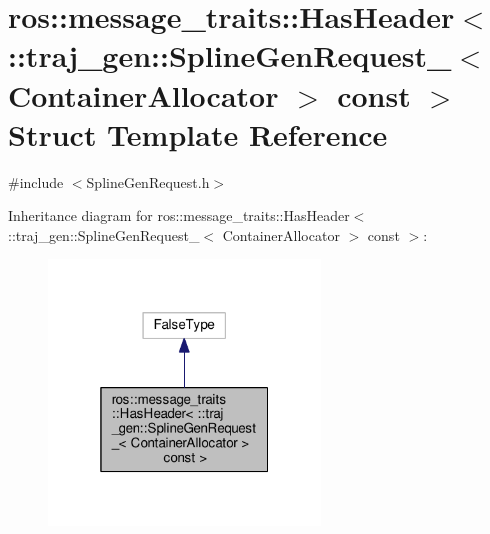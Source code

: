 \hypertarget{structros_1_1message__traits_1_1_has_header_3_01_1_1traj__gen_1_1_spline_gen_request___3_01_cont2d272e5e4f2aba4d565aef3b6188f511}{}\section{ros\+:\+:message\+\_\+traits\+:\+:Has\+Header$<$ \+:\+:traj\+\_\+gen\+:\+:Spline\+Gen\+Request\+\_\+$<$ Container\+Allocator $>$ const $>$ Struct Template Reference}
\label{structros_1_1message__traits_1_1_has_header_3_01_1_1traj__gen_1_1_spline_gen_request___3_01_cont2d272e5e4f2aba4d565aef3b6188f511}


{\ttfamily \#include $<$Spline\+Gen\+Request.\+h$>$}



Inheritance diagram for ros\+:\+:message\+\_\+traits\+:\+:Has\+Header$<$ \+:\+:traj\+\_\+gen\+:\+:Spline\+Gen\+Request\+\_\+$<$ Container\+Allocator $>$ const $>$\+:
\nopagebreak
\begin{figure}[H]
\begin{center}
\leavevmode
\includegraphics[width=205pt]{structros_1_1message__traits_1_1_has_header_3_01_1_1traj__gen_1_1_spline_gen_request___3_01_cont768eff21fd009d3bc1099511abeecb92}
\end{center}
\end{figure}


